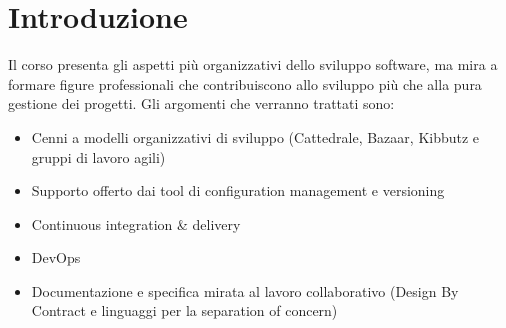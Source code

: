 \section{Introduzione}

Il corso presenta gli aspetti più organizzativi dello sviluppo software, ma mira a formare figure professionali che contribuiscono allo sviluppo più che alla pura gestione dei progetti. Gli argomenti che verranno trattati sono:
\begin{itemize}
    \item Cenni a modelli organizzativi di sviluppo (Cattedrale, Bazaar, Kibbutz e gruppi di lavoro agili)
    \item Supporto offerto dai tool di configuration management e versioning
    \item Continuous integration \& delivery
    \item DevOps
    \item Documentazione e specifica mirata al lavoro collaborativo (Design By Contract e linguaggi per la separation of concern)
\end{itemize}

